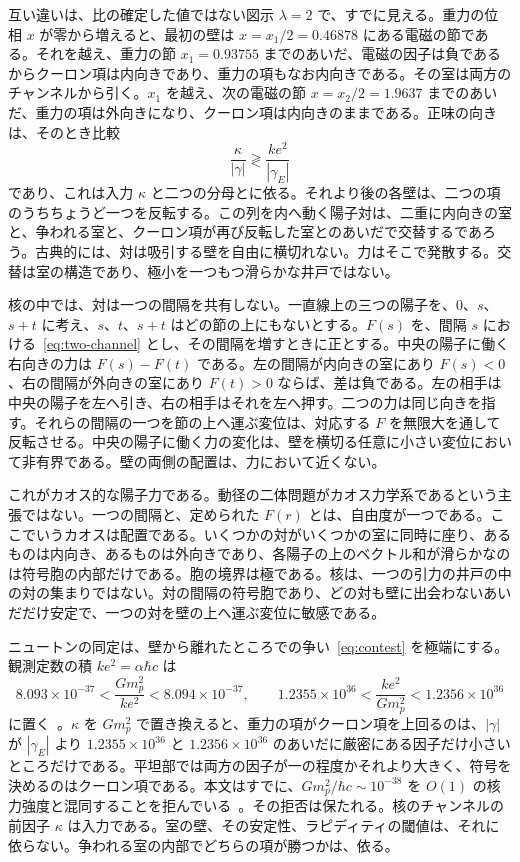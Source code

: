 \documentclass[a4paper]{article}
\begin{document}
互い違いは、比の確定した値ではない図示 \(\lambda=2\) で、すでに見える。重力の位相 \(x\) が零から増えると、最初の壁は \(x=x_1/2=0.46878\) にある電磁の節である。それを越え、重力の節 \(x_1=0.93755\) までのあいだ、電磁の因子は負であるからクーロン項は内向きであり、重力の項もなお内向きである。その室は両方のチャンネルから引く。\(x_1\) を越え、次の電磁の節 \(x=x_2/2=1.9637\) までのあいだ、重力の項は外向きになり、クーロン項は内向きのままである。正味の向きは、そのとき比較
\begin{equation}
\label{eq:contest}
\frac{\kappa}{|\gamma|}
  \gtrless
  \frac{k e^{2}}{|\gamma_E|}
\end{equation}
であり、これは入力 \(\kappa\) と二つの分母とに依る。それより後の各壁は、二つの項のうちちょうど一つを反転する。この列を内へ動く陽子対は、二重に内向きの室と、争われる室と、クーロン項が再び反転した室とのあいだで交替するであろう。古典的には、対は吸引する壁を自由に横切れない。力はそこで発散する。交替は室の構造であり、極小を一つもつ滑らかな井戸ではない。

核の中では、対は一つの間隔を共有しない。一直線上の三つの陽子を、\(0\)、\(s\)、\(s+t\) に考え、\(s\)、\(t\)、\(s+t\) はどの節の上にもないとする。\(F(s)\) を、間隔 \(s\) における~\eqref{eq:two-channel} とし、その間隔を増すときに正とする。中央の陽子に働く右向きの力は \(F(s)-F(t)\) である。左の間隔が内向きの室にあり \(F(s)<0\)、右の間隔が外向きの室にあり \(F(t)>0\) ならば、差は負である。左の相手は中央の陽子を左へ引き、右の相手はそれを左へ押す。二つの力は同じ向きを指す。それらの間隔の一つを節の上へ運ぶ変位は、対応する \(F\) を無限大を通して反転させる。中央の陽子に働く力の変化は、壁を横切る任意に小さい変位において非有界である。壁の両側の配置は、力において近くない。

これがカオス的な陽子力である。動径の二体問題がカオス力学系であるという主張ではない。一つの間隔と、定められた \(F(r)\) とは、自由度が一つである。ここでいうカオスは配置である。いくつかの対がいくつかの室に同時に座り、あるものは内向き、あるものは外向きであり、各陽子の上のベクトル和が滑らかなのは符号胞の内部だけである。胞の境界は極である。核は、一つの引力の井戸の中の対の集まりではない。対の間隔の符号胞であり、どの対も壁に出会わないあいだだけ安定で、一つの対を壁の上へ運ぶ変位に敏感である。

ニュートンの同定は、壁から離れたところでの争い~\eqref{eq:contest} を極端にする。観測定数の積 \(ke^{2}=\alpha\hbar c\) は
\begin{equation}
\label{eq:ratio}
8.093\times 10^{-37}
  <\frac{G m_p^{2}}{ke^{2}}
  <8.094\times 10^{-37},
\qquad
1.2355\times 10^{36}
  <\frac{ke^{2}}{G m_p^{2}}
  <1.2356\times 10^{36}
\end{equation}
に置く~\cite{codata2018}。\(\kappa\) を \(G m_p^2\) で置き換えると、重力の項がクーロン項を上回るのは、\(|\gamma|\) が \(|\gamma_E|\) より \(1.2355\times 10^{36}\) と \(1.2356\times 10^{36}\) のあいだに厳密にある因子だけ小さいところだけである。平坦部では両方の因子が一の程度かそれより大きく、符号を決めるのはクーロン項である。本文はすでに、\(G m_p^{2}/\hbar c\sim 10^{-38}\) を \(O(1)\) の核力強度と混同することを拒んでいる~\cite{dst-main}。その拒否は保たれる。核のチャンネルの前因子 \(\kappa\) は入力である。室の壁、その安定性、ラピディティの閾値は、それに依らない。争われる室の内部でどちらの項が勝つかは、依る。
\end{document}
